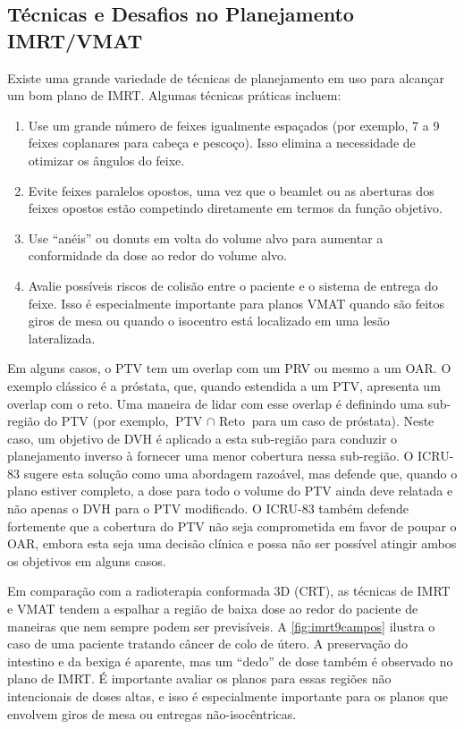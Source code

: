 \documentclass[11pt,a4paper]{article}
\newcounter{exemplo}
\begin{document}
\subsection*{Técnicas e Desafios no Planejamento IMRT/VMAT}

	Existe uma grande variedade de técnicas de planejamento em uso para alcançar um bom plano de IMRT. Algumas técnicas práticas incluem:

	\begin{enumerate}
		\item Use um grande número de feixes igualmente espaçados (por exemplo, 7 a 9 feixes coplanares para cabeça e pescoço). Isso elimina a necessidade de otimizar os ângulos do feixe.
		\item Evite feixes paralelos opostos, uma vez que o beamlet ou as aberturas dos feixes opostos estão competindo diretamente em termos da função objetivo.
		\item Use “anéis” ou donuts em volta do volume alvo para aumentar a conformidade da dose ao redor do volume alvo.
		\item Avalie possíveis riscos de colisão entre o paciente e o sistema de entrega do feixe. Isso é especialmente importante para planos VMAT quando são feitos giros de mesa ou quando o isocentro está localizado em uma lesão lateralizada.
	\end{enumerate}

	Em alguns casos, o PTV tem um overlap com um PRV ou mesmo a um OAR. O exemplo clássico é a próstata, que, quando estendida a um PTV, apresenta um overlap com o reto. Uma maneira de lidar com esse overlap é definindo uma sub-região do PTV (por exemplo, $\text{PTV }\cap \text{ Reto}$ para um caso de próstata). Neste caso, um objetivo de DVH é aplicado a esta sub-região para conduzir o planejamento inverso à fornecer uma menor cobertura nessa sub-região. O ICRU-83 sugere esta solução como uma abordagem razoável, mas defende que, quando o plano estiver completo, a dose para todo o volume do PTV ainda deve relatada e não apenas o DVH para o PTV modificado. O ICRU-83 também defende fortemente que a cobertura do PTV não seja comprometida em favor de poupar o OAR, embora esta seja uma decisão clínica e possa não ser possível atingir ambos os objetivos em alguns casos.

	Em comparação com a radioterapia conformada 3D (CRT), as técnicas de IMRT e VMAT tendem a espalhar a região de baixa dose ao redor do paciente de maneiras que nem sempre podem ser previsíveis. A \ref{fig:imrt9campos} ilustra o caso de uma paciente tratando câncer de colo de útero. A preservação do intestino e da bexiga é aparente, mas um “dedo” de dose também é observado no plano de IMRT. É importante avaliar os planos para essas regiões não intencionais de doses altas, e isso é especialmente importante para os planos que envolvem giros de mesa ou entregas não-isocêntricas.
\end{document}
